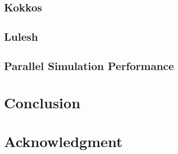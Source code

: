 \documentclass[12pt]{article}
\begin{document}
    \subsection{Kokkos}
        
    \subsection{Lulesh}
        
    \subsection{Parallel Simulation Performance}
        
%
\section{Conclusion}
    

\clearpage
\section*{Acknowledgment}


\clearpage



\end{document}
